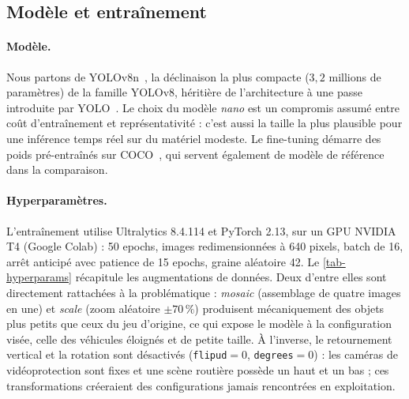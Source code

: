 \subsection{Modèle et entraînement}\label{sec-entrainement}

\paragraph{Modèle.}
Nous partons de YOLOv8n~\cite{yolov8_ultralytics}, la déclinaison la plus
compacte ($3{,}2$ millions de paramètres) de la famille
YOLOv8, héritière de l'architecture à une passe introduite par
YOLO~\cite{redmon2016yolo}. Le choix du modèle \emph{nano} est un
compromis assumé entre coût d'entraînement et représentativité : c'est
aussi la taille la plus plausible pour une inférence temps réel sur du
matériel modeste. Le fine-tuning démarre des poids pré-entraînés sur
COCO~\cite{lin2014coco}, qui servent également de modèle de référence
dans la comparaison.

\paragraph{Hyperparamètres.}
L'entraînement utilise Ultralytics 8.4.114 et PyTorch 2.13, sur un GPU
NVIDIA T4 (Google Colab) : 50 epochs, images redimensionnées à 640 pixels,
batch de 16, arrêt anticipé avec patience de 15 epochs, graine aléatoire 42.
Le \cref{tab-hyperparams} récapitule les augmentations de données.
Deux d'entre elles sont directement rattachées à la problématique :
\emph{mosaic} (assemblage de quatre images en une) et \emph{scale}
(zoom aléatoire $\pm 70\,\%$) produisent mécaniquement des objets plus
petits que ceux du jeu d'origine, ce qui expose le modèle à la
configuration visée, celle des véhicules éloignés et de petite taille. À
l'inverse, le retournement vertical et la rotation sont désactivés
(\texttt{flipud}${}=0$, \texttt{degrees}${}=0$) : les caméras de
vidéoprotection sont fixes et une scène routière possède un haut et un
bas ; ces transformations créeraient des configurations jamais
rencontrées en exploitation.

